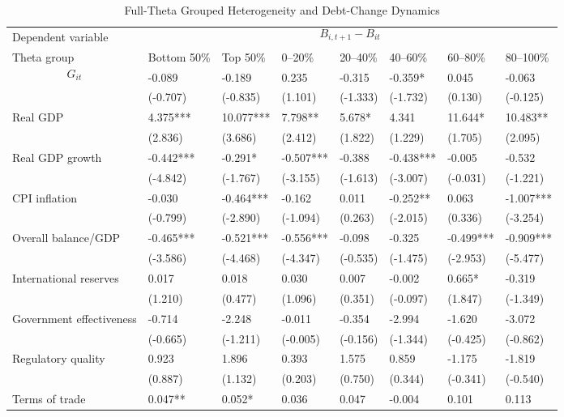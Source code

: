 \begin{table}[H]\centering
\begin{threeparttable}
\caption{Full-Theta Grouped Heterogeneity and Debt-Change Dynamics}
\label{tab:theta_group_heterogeneity_debt}
\scriptsize
\begin{tabularx}{\textwidth}{lYYYYYYY}
\toprule
Dependent variable &  \\
\cmidrule(lr){2-8}
Theta group & Bottom 50\% & Top 50\% & 0--20\% & 20--40\% & 40--60\% & 60--80\% & 80--100\% \\
\midrule
$$G_{it}$$ & -0.089 & -0.189 & 0.235 & -0.315 & -0.359* & 0.045 & -0.063 \\
  & (-0.707) & (-0.835) & (1.101) & (-1.333) & (-1.732) & (0.130) & (-0.125) \\
Real GDP & 4.375*** & 10.077*** & 7.798** & 5.678* & 4.341 & 11.644* & 10.483** \\
  & (2.836) & (3.686) & (2.412) & (1.822) & (1.229) & (1.705) & (2.095) \\
Real GDP growth & -0.442*** & -0.291* & -0.507*** & -0.388 & -0.438*** & -0.005 & -0.532 \\
  & (-4.842) & (-1.767) & (-3.155) & (-1.613) & (-3.007) & (-0.031) & (-1.221) \\
CPI inflation & -0.030 & -0.464*** & -0.162 & 0.011 & -0.252** & 0.063 & -1.007*** \\
  & (-0.799) & (-2.890) & (-1.094) & (0.263) & (-2.015) & (0.336) & (-3.254) \\
Overall balance/GDP & -0.465*** & -0.521*** & -0.556*** & -0.098 & -0.325 & -0.499*** & -0.909*** \\
  & (-3.586) & (-4.468) & (-4.347) & (-0.535) & (-1.475) & (-2.953) & (-5.477) \\
International reserves & 0.017 & 0.018 & 0.030 & 0.007 & -0.002 & 0.665* & -0.319 \\
  & (1.210) & (0.477) & (1.096) & (0.351) & (-0.097) & (1.847) & (-1.349) \\
Government effectiveness & -0.714 & -2.248 & -0.011 & -0.354 & -2.994 & -1.620 & -3.072 \\
  & (-0.665) & (-1.211) & (-0.005) & (-0.156) & (-1.344) & (-0.425) & (-0.862) \\
Regulatory quality & 0.923 & 1.896 & 0.393 & 1.575 & 0.859 & -1.175 & -1.819 \\
  & (0.887) & (1.132) & (0.203) & (0.750) & (0.344) & (-0.341) & (-0.540) \\
Terms of trade & 0.047** & 0.052* & 0.036 & 0.047 & -0.004 & 0.101 & 0.113 \\

\end{tabularx}
\end{threeparttable}
\end{table}
